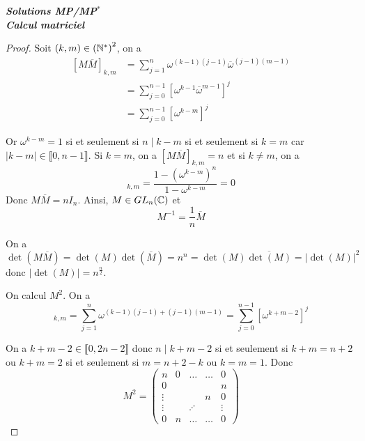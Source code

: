 \documentclass[12pt]{article}
\begin{document}
\begin{titlepage}
	\centering
	\vspace*{\fill}
	\Huge \textit{\textbf{Solutions MP/MP$^*$\\ Calcul matriciel}}
	\vspace*{\fill}
\end{titlepage}

\begin{proof}
    Soit $(k,m)\in\left(\mathbb{N}^{*}\right)^{2}$, on a 
    \begin{align}
        \left[M\overline{M}\right]_{k,m}
        &=\sum_{j=1}^{n}\omega^{(k-1)(j-1)}\overline{\omega}^{(j-1)(m-1)}\\
        &=\sum_{j=0}^{n-1}\left[\omega^{k-1}\overline{\omega}^{m-1}\right]^{j}\\
        &=\sum_{j=0}^{n-1}\left[\omega^{k-m}\right]^{j}
    \end{align}

    Or $\omega^{k-m}=1$ si et seulement si $n\mid k-m$ si et seulement si $k=m$ car $\left\lvert k-m\right\rvert\in\llbracket0,n-1\rrbracket$. Si $k=m$, on a $[M\overline{M}]_{k,m}=n$ et si $k\neq m$, on a 
    \begin{equation}
        [M\overline{M}]_{k,m}=\frac{1-\left(\omega^{k-m}\right)^{n}}{1-\omega^{k-m}}=0
    \end{equation}
    Donc $M\overline{M}=nI_{n}$. Ainsi, $M\in GL_{n}(\mathbb{C})$ et 
    \begin{equation}
        \boxed{M^{-1}=\frac{1}{n}\overline{M}}
    \end{equation}

    On a $\det(M\overline{M})=\det(M)\det(\overline{M})=n^{n}=\det(M)\overline{\det(M)}=\left\lvert\det(M)\right\rvert^{2}$ donc $\left\lvert\det(M)\right\rvert=n^{\frac{n}{2}}$.

    On calcul $M^{2}$. On a 
    \begin{equation}
        [M^{2}]_{k,m}=\sum_{j=1}^{n}\omega^{(k-1)(j-1)+(j-1)(m-1)}=\sum_{j=0}^{n-1}\left[\omega^{k+m-2}\right]^{j}
    \end{equation}

    On a $k+m-2\in\llbracket0,2n-2\rrbracket$ donc $n\mid k+m-2$ si et seulement si $k+m=n+2$ ou $k+m=2$ si et seulement si $m=n+2-k$ ou $k=m=1$. Donc 
    \begin{equation}
        M^{2}=
        \begin{pmatrix}
            n       & 0         & \dots     & \dots & 0\\
            0       &           &           &       & n\\
            \vdots  &           &           & n     & 0\\
            \vdots  &           & \iddots   &       & \vdots\\
            0       & n         &\dots      &\dots  &0
        \end{pmatrix}
    \end{equation}


\end{proof}
\end{document}
